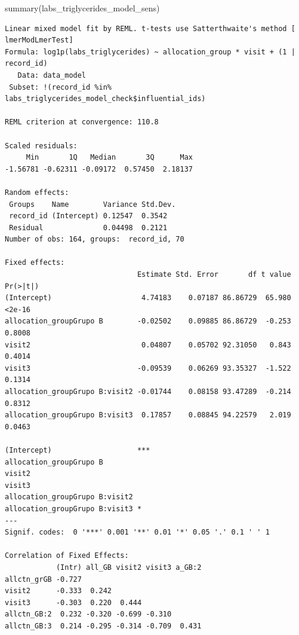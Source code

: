 \documentclass[
  letterpaper,
  DIV=11,
  numbers=noendperiod]{scrartcl}
\newenvironment{Shaded}{\begin{snugshade}}{\end{snugshade}}
\newcommand{\FunctionTok}[1]{\textcolor[rgb]{0.28,0.35,0.67}{#1}}
\newcommand{\NormalTok}[1]{\textcolor[rgb]{0.00,0.23,0.31}{#1}}
\newcommand{\SpecialCharTok}[1]{\textcolor[rgb]{0.37,0.37,0.37}{#1}}
\begin{document}
\begin{Shaded}
\begin{Highlighting}[]
\FunctionTok{summary}\NormalTok{(labs\_triglycerides\_model\_sens)}
\end{Highlighting}
\end{Shaded}

\begin{verbatim}
Linear mixed model fit by REML. t-tests use Satterthwaite's method [
lmerModLmerTest]
Formula: log1p(labs_triglycerides) ~ allocation_group * visit + (1 | record_id)
   Data: data_model
 Subset: !(record_id %in% labs_triglycerides_model_check$influential_ids)

REML criterion at convergence: 110.8

Scaled residuals: 
     Min       1Q   Median       3Q      Max 
-1.56781 -0.62311 -0.09172  0.57450  2.18137 

Random effects:
 Groups    Name        Variance Std.Dev.
 record_id (Intercept) 0.12547  0.3542  
 Residual              0.04498  0.2121  
Number of obs: 164, groups:  record_id, 70

Fixed effects:
                               Estimate Std. Error       df t value Pr(>|t|)
(Intercept)                     4.74183    0.07187 86.86729  65.980   <2e-16
allocation_groupGrupo B        -0.02502    0.09885 86.86729  -0.253   0.8008
visit2                          0.04807    0.05702 92.31050   0.843   0.4014
visit3                         -0.09539    0.06269 93.35327  -1.522   0.1314
allocation_groupGrupo B:visit2 -0.01744    0.08158 93.47289  -0.214   0.8312
allocation_groupGrupo B:visit3  0.17857    0.08845 94.22579   2.019   0.0463
                                  
(Intercept)                    ***
allocation_groupGrupo B           
visit2                            
visit3                            
allocation_groupGrupo B:visit2    
allocation_groupGrupo B:visit3 *  
---
Signif. codes:  0 '***' 0.001 '**' 0.01 '*' 0.05 '.' 0.1 ' ' 1

Correlation of Fixed Effects:
            (Intr) all_GB visit2 visit3 a_GB:2
allctn_grGB -0.727                            
visit2      -0.333  0.242                     
visit3      -0.303  0.220  0.444              
allctn_GB:2  0.232 -0.320 -0.699 -0.310       
allctn_GB:3  0.214 -0.295 -0.314 -0.709  0.431
\end{verbatim}

\begin{Shaded}
\end{Shaded}
\end{document}
